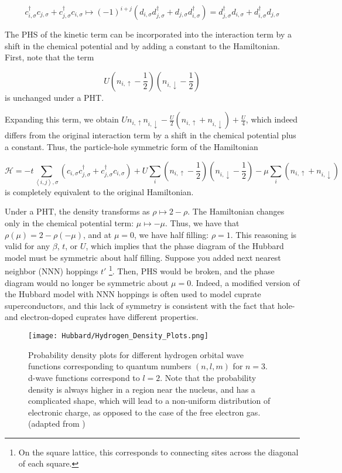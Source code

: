 \begin{equation}
c_{i, \sigma}^\dagger c_{j, \sigma} + c_{j, \sigma}^\dagger c_{i, \sigma} \mapsto (-1)^{i+j} ( d_{i, \sigma} d_{j, \sigma}^\dagger + d_{j, \sigma} d_{i, \sigma}^\dagger ) = d_{j, \sigma}^\dagger d_{i, \sigma} + d_{i, \sigma}^\dagger d_{j, \sigma}
\end{equation}

The \ac{PHS} of the kinetic term can be incorporated into the interaction term by a shift in the chemical potential and by adding a constant to the Hamiltonian.
First, note that the term

\begin{equation*}
U ( n_{i,\uparrow} - \frac{1}{2} ) ( n_{i,\downarrow} - \frac{1}{2} )
\end{equation*}
is unchanged under a \ac{PHT}.

Expanding this term, we obtain $U n_{i,\uparrow} n_{i,\downarrow} - \frac{U}{2} (n_{i,\uparrow} + n_{i,\downarrow}) + \frac{U}{4}$, which indeed differs from the original interaction term by a shift in the chemical potential plus a constant.
Thus, the particle-hole symmetric form of the Hamiltonian 

\begin{equation}
\mathcal{H} = -t \sum_{\left\langle i, j \right \rangle, \sigma} ( c_{i,\sigma} c_{j,\sigma}^\dagger + c_{j,\sigma}^\dagger c_{i,\sigma} ) + U \sum_{i} ( n_{i,\uparrow} - \frac{1}{2} ) ( n_{i,\downarrow} - \frac{1}{2} ) -\mu \sum_i ( n_{i,\uparrow} + n_{i,\downarrow} )
\end{equation}
is completely equivalent to the original Hamiltonian.

Under a \ac{PHT}, the density transforms as $\rho \mapsto 2 - \rho$.
The Hamiltonian changes only in the chemical potential term: $\mu \mapsto -\mu$.
Thus, we have that $\rho (\mu) = 2 - \rho (-\mu)$, and at $\mu = 0$, we have half filling: $\rho = 1$.
This reasoning is valid for any $\beta$, $t$, or $U$, which implies that the phase diagram of the Hubbard model must be symmetric about half filling.
Suppose you added next nearest neighbor (NNN) hoppings $t'$ \footnote{On the square lattice, this corresponds to connecting sites across the diagonal of each square.}.
Then, PHS would be broken, and the phase diagram would no longer be symmetric about $\mu = 0$.
Indeed, a modified version of the Hubbard model with NNN hoppings is often used to model cuprate superconductors, and this lack of symmetry is consistent with the fact that hole- and electron-doped cuprates have different properties. 

\begin{figure}[H]\label{fig:hydrogenWF}
\centering
\texttt{[image: Hubbard/Hydrogen\_Density\_Plots.png]}
\caption[Hydrogen atomic wave functions.]{Probability density plots for different hydrogen orbital wave functions corresponding to quantum numbers $(n, l, m)$ for $n = 3$.
d-wave functions correspond to $l=2$. Note that the probability density is always higher in a region near the nucleus, and has a complicated shape, which will lead to a non-uniform distribution of electronic charge, as opposed to the case of the free electron gas. (adapted from \cite{hydrogen})}
\end{figure}